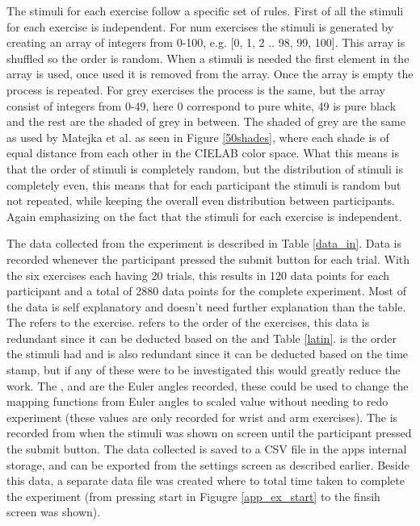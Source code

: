 The stimuli for each exercise follow a specific set of rules. First of all the stimuli for each exercise is independent. For num exercises the stimuli is generated by creating an array of integers from 0-100, e.g. [0, 1, 2 .. 98, 99, 100]. This array is shuffled so the order is random. When a stimuli is needed the first element in the array is used, once used it is removed from the array. Once the array is empty the process is repeated. For grey exercises the process is the same, but the array consist of integers from 0-49, here 0 correspond to pure white, 49 is pure black and the rest are the shaded of grey in between. The shaded of grey are the same as used by Matejka et al.\cite{grey} as seen in Figure \ref{50shades}, where each shade is of equal distance from each other in the CIELAB color space\cite{cielab}. What this means is that the order of stimuli is completely random, but the distribution of stimuli is completely even, this means that for each participant the stimuli is random but not repeated, while keeping the overall even distribution between participants. Again emphasizing on the fact that the stimuli for each exercise is independent.

The data collected from the experiment is described in Table \ref{data_in}. Data is recorded whenever the participant pressed the submit button for each trial. With the six exercises each having 20 trials, this results in 120 data points for each participant and a total of 2880 data points for the complete experiment. Most of the data is self explanatory and doesn't need further explanation than the table. The  refers to the exercise.  refers to the order of the exercises, this data is redundant since it can be deducted based on the  and Table \ref{latin}.  is the order the stimuli had and is also redundant since it can be deducted based on the time stamp, but if any of these were to be investigated this would greatly reduce the work. The ,  and  are the Euler angles recorded, these could be used to change the mapping functions from Euler angles to scaled value without needing to redo experiment (these values are only recorded for wrist and arm exercises). The  is recorded from when the stimuli was shown on screen until the participant pressed the submit button. The data collected is saved to a CSV file in the apps internal storage, and can be exported from the settings screen as described earlier. Beside this data, a separate data file was created where to total time taken to complete the experiment (from pressing start in Figugre \ref{app_ex_start} to the finsih screen was shown).


